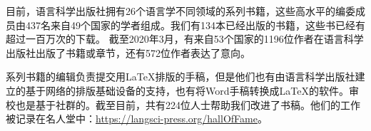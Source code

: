 目前，语言科学出版社拥有26个语言学不同领域的系列书籍，这些高水平的编委成员由437名来自49个国家的学者组成。我们有134本已经出版的书籍，这些书已经有超过一百万次的下载。 截至2020年3月，有来自53个国家的1196位作者在语言科学出版社出版了书籍或章节，还有572位作者表达了意向。


系列书籍的编辑负责提交用\LaTeX{}排版的手稿，但是他们也有由语言科学出版社建立的基于网络的排版基础设备的支持，也有将Word手稿转换成\LaTeX{}的软件。审校也是基于社群的。截至目前，共有224位人士帮助我们改进了书稿。他们的工作被记录在名人堂中：\url{https://langsci-press.org/hallOfFame}。


